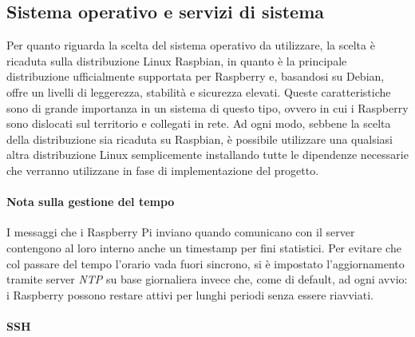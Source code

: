 \subsection{Sistema operativo e servizi di sistema}
Per quanto riguarda la scelta del sistema operativo da utilizzare, la scelta è ricaduta sulla distribuzione Linux Raspbian, in quanto è la principale distribuzione ufficialmente supportata per Raspberry e, basandosi su Debian, offre un livelli di leggerezza, stabilità e sicurezza elevati.
Queste caratteristiche sono di grande importanza in un sistema di questo tipo, ovvero in cui i Raspberry sono dislocati sul territorio e collegati in rete.
Ad ogni modo, sebbene la scelta della distribuzione sia ricaduta su Raspbian, è possibile utilizzare una qualsiasi altra distribuzione Linux semplicemente installando tutte le dipendenze necessarie che verranno utilizzane in fase di implementazione del progetto.
\paragraph{Nota sulla gestione del tempo}
I messaggi che i Raspberry Pi inviano quando comunicano con il server contengono al loro interno anche un timestamp per fini statistici.
Per evitare che col passare del tempo l'orario vada fuori sincrono, si è impostato l'aggiornamento tramite server \textit{NTP} su base giornaliera invece che, come di default, ad ogni avvio: i Raspberry possono restare attivi per lunghi periodi senza essere riavviati.
\paragraph{SSH}


